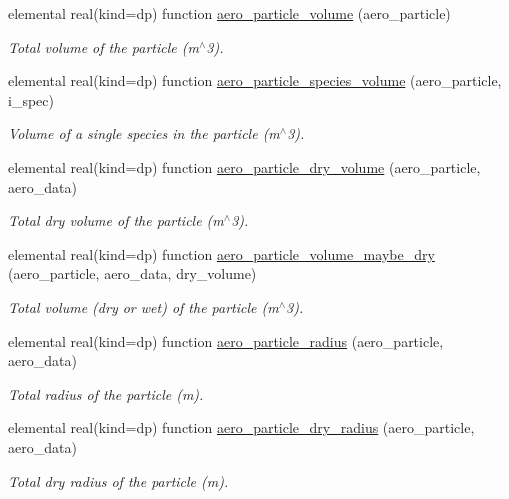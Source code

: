 \begin{DoxyCompactItemize}
elemental real(kind=dp) function \mbox{\hyperlink{namespacepmc__aero__particle_a432c6796b18e1d002b7164eeba6560f0}{aero\+\_\+particle\+\_\+volume}} (aero\+\_\+particle)
\begin{DoxyCompactList}\small\item\em Total volume of the particle (m$^\wedge$3). \end{DoxyCompactList}\item 
elemental real(kind=dp) function \mbox{\hyperlink{namespacepmc__aero__particle_a978fa20bca2318ae8f14c3917406abcb}{aero\+\_\+particle\+\_\+species\+\_\+volume}} (aero\+\_\+particle, i\+\_\+spec)
\begin{DoxyCompactList}\small\item\em Volume of a single species in the particle (m$^\wedge$3). \end{DoxyCompactList}\item 
elemental real(kind=dp) function \mbox{\hyperlink{namespacepmc__aero__particle_a62de3ac045c2de8e165b3adb79f51ef3}{aero\+\_\+particle\+\_\+dry\+\_\+volume}} (aero\+\_\+particle, aero\+\_\+data)
\begin{DoxyCompactList}\small\item\em Total dry volume of the particle (m$^\wedge$3). \end{DoxyCompactList}\item 
elemental real(kind=dp) function \mbox{\hyperlink{namespacepmc__aero__particle_aa07ec8ccef0daf01ab96339f823eb677}{aero\+\_\+particle\+\_\+volume\+\_\+maybe\+\_\+dry}} (aero\+\_\+particle, aero\+\_\+data, dry\+\_\+volume)
\begin{DoxyCompactList}\small\item\em Total volume (dry or wet) of the particle (m$^\wedge$3). \end{DoxyCompactList}\item 
elemental real(kind=dp) function \mbox{\hyperlink{namespacepmc__aero__particle_a9f3e4a32d7345bfdcfbf2c1bed7230dc}{aero\+\_\+particle\+\_\+radius}} (aero\+\_\+particle, aero\+\_\+data)
\begin{DoxyCompactList}\small\item\em Total radius of the particle (m). \end{DoxyCompactList}\item 
elemental real(kind=dp) function \mbox{\hyperlink{namespacepmc__aero__particle_acb06f29420c625923fbc8f7a8fd491d0}{aero\+\_\+particle\+\_\+dry\+\_\+radius}} (aero\+\_\+particle, aero\+\_\+data)
\begin{DoxyCompactList}\small\item\em Total dry radius of the particle (m). \end{DoxyCompactList}\item 

\end{DoxyCompactItemize}
